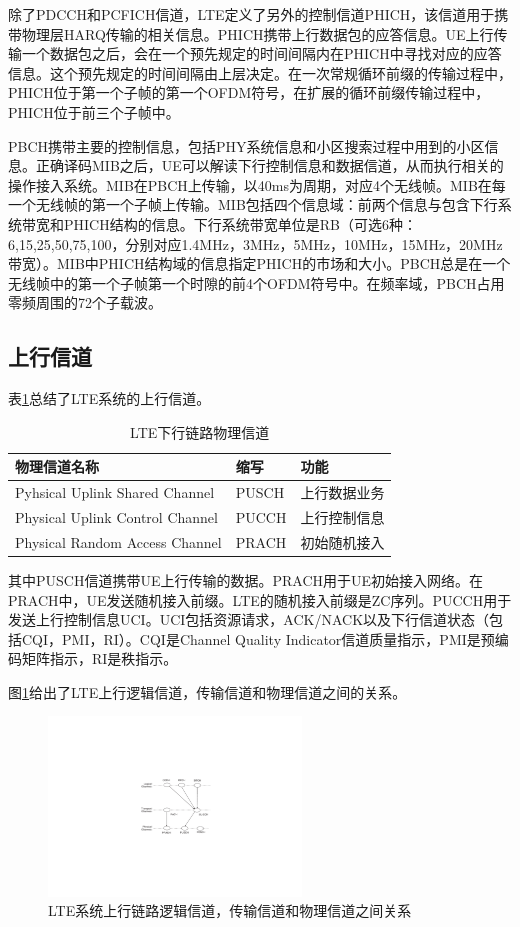 \documentclass[10pt,a4paper,UTF8]{article}
\begin{document}
除了PDCCH和PCFICH信道，LTE定义了另外的控制信道PHICH，该信道用于携带物理层HARQ传输的相关信息。PHICH携带上行数据包的应答信息。UE上行传输一个数据包之后，会在一个预先规定的时间间隔内在PHICH中寻找对应的应答信息。这个预先规定的时间间隔由上层决定。在一次常规循环前缀的传输过程中，PHICH位于第一个子帧的第一个OFDM符号，在扩展的循环前缀传输过程中，PHICH位于前三个子帧中。

PBCH携带主要的控制信息，包括PHY系统信息和小区搜索过程中用到的小区信息。正确译码MIB之后，UE可以解读下行控制信息和数据信道，从而执行相关的操作接入系统。MIB在PBCH上传输，以40ms为周期，对应4个无线帧。MIB在每一个无线帧的第一个子帧上传输。MIB包括四个信息域：前两个信息与包含下行系统带宽和PHICH结构的信息。下行系统带宽单位是RB（可选6种：6,15,25,50,75,100，分别对应1.4MHz，3MHz，5MHz，10MHz，15MHz，20MHz带宽）。MIB中PHICH结构域的信息指定PHICH的市场和大小。PBCH总是在一个无线帧中的第一个子帧第一个时隙的前4个OFDM符号中。在频率域，PBCH占用零频周围的72个子载波。
\subsection{上行信道}
\label{sec:orgheadline18}


表\ref{tab:orgtable4}总结了LTE系统的上行信道。
\begin{table}[htb]
\caption{\label{tab:orgtable4}
LTE下行链路物理信道}
\centering
\begin{tabular}{lll}
\hline
物理信道名称 & 缩写 & 功能\\
\hline
Pyhsical Uplink Shared Channel & PUSCH & 上行数据业务\\
Physical Uplink Control Channel & PUCCH & 上行控制信息\\
Physical Random Access Channel & PRACH & 初始随机接入\\
\hline
\end{tabular}
\end{table}
其中PUSCH信道携带UE上行传输的数据。PRACH用于UE初始接入网络。在PRACH中，UE发送随机接入前缀。LTE的随机接入前缀是ZC序列。PUCCH用于发送上行控制信息UCI。UCI包括资源请求，ACK/NACK以及下行信道状态（包括CQI，PMI，RI）。CQI是Channel Quality Indicator信道质量指示，PMI是预编码矩阵指示，RI是秩指示。

图\ref{fig:orgparagraph9}给出了LTE上行逻辑信道，传输信道和物理信道之间的关系。

\begin{figure}[htb]
\centering
\includegraphics[width=0.6\textwidth]{../../img/20151104lteuplinkchannel.pdf}
\caption{\label{fig:orgparagraph9}
LTE系统上行链路逻辑信道，传输信道和物理信道之间关系}
\end{figure}
\end{document}
